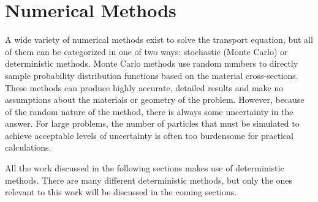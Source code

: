 \section{Numerical Methods}

A wide variety of numerical methods exist to solve the transport equation, but all of them can be categorized in one of two ways: stochastic (Monte Carlo) or deterministic methods.  Monte Carlo methods use random numbers to directly sample probability distribution functions based on the material cross-sections.  These methods can produce highly accurate, detailed results and make no assumptions about the materials or geometry of the problem.  However, because of the random nature of the method, there is always some uncertainty in the answer.  For large problems, the number of particles that must be simulated to achieve acceptable levels of uncertainty is often too burdensome  for practical calculations.

All the work discussed in the following sections makes use of deterministic methods.  There are many different deterministic methods, but only the ones relevant to this work will be discussed in the coming sections.

